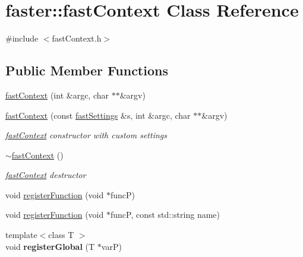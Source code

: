 \hypertarget{classfaster_1_1fastContext}{}\section{faster\+:\+:fast\+Context Class Reference}
\label{classfaster_1_1fastContext}


{\ttfamily \#include $<$fast\+Context.\+h$>$}

\subsection*{Public Member Functions}
\begin{DoxyCompactItemize}
\item 
\hyperlink{classfaster_1_1fastContext_a8e4531e2352a60246205ba69969f1f6b}{fast\+Context} (int \&argc, char $\ast$$\ast$\&argv)
\item 
\hypertarget{classfaster_1_1fastContext_a961ba8c8ffa9a9b4634e6d6bb4d685ea}{}\hyperlink{classfaster_1_1fastContext_a961ba8c8ffa9a9b4634e6d6bb4d685ea}{fast\+Context} (const \hyperlink{classfaster_1_1fastSettings}{fast\+Settings} \&s, int \&argc, char $\ast$$\ast$\&argv)\label{classfaster_1_1fastContext_a961ba8c8ffa9a9b4634e6d6bb4d685ea}

\begin{DoxyCompactList}\small\item\em \hyperlink{classfaster_1_1fastContext}{fast\+Context} constructor with custom settings \end{DoxyCompactList}\item 
\hypertarget{classfaster_1_1fastContext_a055ea19ba9b7597ebd8b2d950a2d7e06}{}\hyperlink{classfaster_1_1fastContext_a055ea19ba9b7597ebd8b2d950a2d7e06}{$\sim$fast\+Context} ()\label{classfaster_1_1fastContext_a055ea19ba9b7597ebd8b2d950a2d7e06}

\begin{DoxyCompactList}\small\item\em \hyperlink{classfaster_1_1fastContext}{fast\+Context} destructor \end{DoxyCompactList}\item 
void \hyperlink{classfaster_1_1fastContext_a78d8eec46a44c600adb554bcdf8d8a2c}{register\+Function} (void $\ast$func\+P)
\item 
void \hyperlink{classfaster_1_1fastContext_add296b9632bef0f4ceddbdc02a874bb4}{register\+Function} (void $\ast$func\+P, const std\+::string name)
\item 
\hypertarget{classfaster_1_1fastContext_a21c563c0ba6075a6dc31faf14dccb165}{}{\footnotesize template$<$class T $>$ }\\void {\bfseries register\+Global} (T $\ast$var\+P)\label{classfaster_1_1fastContext_a21c563c0ba6075a6dc31faf14dccb165}


\end{DoxyCompactItemize}
